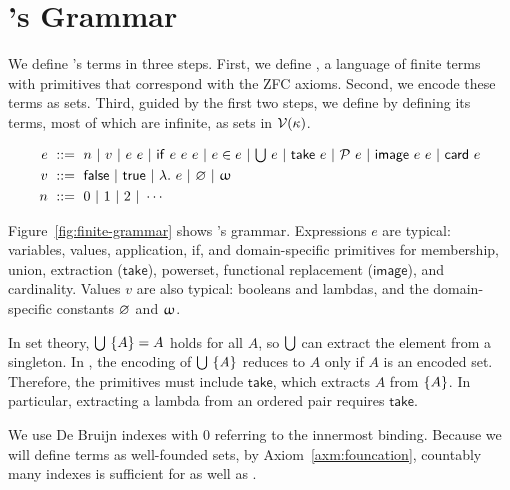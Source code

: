 \section{\targetlang's Grammar}

We define \targetlang's terms in three steps. First, we define \ftargetlang, a language of finite terms with primitives that correspond with the ZFC axioms. Second, we encode these terms as sets. Third, guided by the first two steps, we define \targetlang by defining its terms, most of which are infinite, as sets in $\mathcal{V}(\kappa)$.

\begin{figure*}[tb]\centering
\begin{varwidth}[t]{\textwidth}
\begin{equation*}
\begin{aligned}
	e \ &::=\ n \gor v \gor e\ e \gor \lif{e}{e}{e} \gor e \in e
	  \gor \lunion{e} \gor \ltake{e} \gor \lpowerset{e} \gor \limage{e}{e} \gor \lorder{e} \\
	v \ &::=\ \lfalse \gor \ltrue \gor \lfun{e} \gor \lemptyset \gor \lnat \\
	n \ &::=\ 0 \gor 1 \gor 2 \gor \cdots
\end{aligned}
\end{equation*}
\end{varwidth}
\bottomhrule
\caption[Definition of \ftargetlang]{The definition of \ftargetlang, which represents countably many \targetlang terms.}
\label{fig:finite-grammar}
\end{figure*}

Figure~\ref{fig:finite-grammar} shows \ftargetlang's grammar. Expressions $e$ are typical: variables, values, application, if, and domain-specific primitives for membership, union, extraction ($\mathsf{take}$), powerset, functional replacement ($\mathsf{image}$), and cardinality. Values $v$ are also typical: booleans and lambdas, and the domain-specific constants $\lemptyset$ and $\upomega$.

In set theory, $\textstyle\bigcup\ \{{A}\} = A$ holds for all $A$, so $\textstyle\bigcup$ can extract the element from a singleton. In \targetlang, the encoding of $\U\ \set{\mathit{A}}$ reduces to $A$ only if $A$ is an encoded set. Therefore, the primitives must include $\mathsf{take}$, which extracts $A$ from $\{{A}\}$. In particular, extracting a lambda from an ordered pair requires $\mathsf{take}$.

We use De Bruijn indexes with $0$ referring to the innermost binding. Because we will define \targetlang terms as well-founded sets, by Axiom~\ref{axm:founcation}, countably many indexes is sufficient for \targetlang as well as \ftargetlang.

